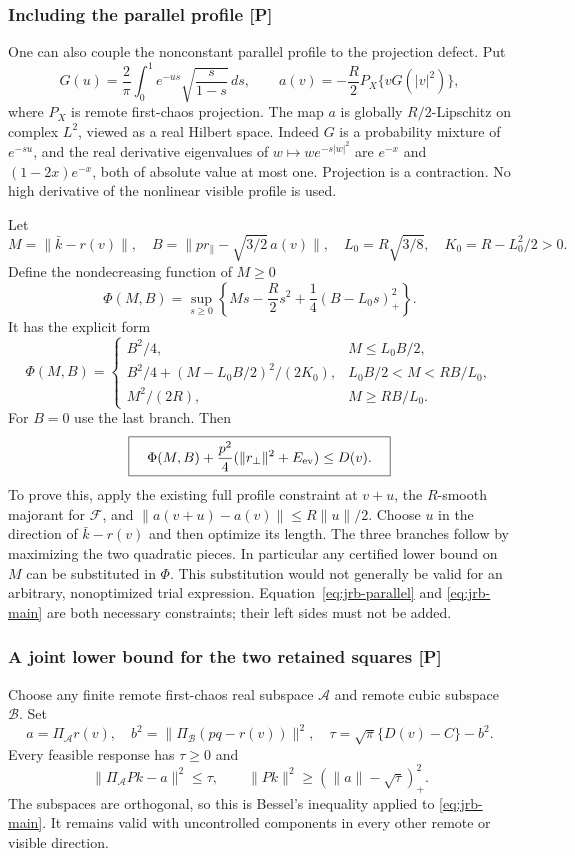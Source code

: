 \subsubsection{Including the parallel profile [P]}
One can also couple the nonconstant parallel profile to the projection
defect. Put
\[
 G(u)=\frac2\pi\int_0^1e^{-us}\sqrt{\frac{s}{1-s}}\,ds,\qquad
 a(v)=-\frac R2P_X\{vG(|v|^2)\},
\]
where $P_X$ is remote first-chaos projection. The map $a$ is globally
$R/2$-Lipschitz on complex $L^2$, viewed as a real Hilbert space.
Indeed $G$ is a probability mixture of $e^{-su}$, and the real derivative
eigenvalues of $w\mapsto we^{-s|w|^2}$ are $e^{-x}$ and
$(1-2x)e^{-x}$, both of absolute value at most one. Projection is a
contraction. No high derivative of the nonlinear visible profile is used.

Let
\[
 M=\|\bar k-r(v)\|,\quad
 B=\|p r_\parallel-\sqrt{3/2}\,a(v)\|,\quad
 L_0=R\sqrt{3/8},\quad K_0=R-L_0^2/2>0.
\]
Define the nondecreasing function of $M\ge0$
\[
 \Phi(M,B)=\sup_{s\ge0}
 \left\{Ms-\frac R2s^2+\frac14(B-L_0s)_+^2\right\}.
\]
It has the explicit form
\[
 \Phi(M,B)=\begin{cases}
 B^2/4,&M\le L_0B/2,\\
 B^2/4+(M-L_0B/2)^2/(2K_0),&L_0B/2<M<RB/L_0,\\
 M^2/(2R),&M\ge RB/L_0.
 \end{cases}
\]
For $B=0$ use the last branch. Then
\begin{equation}\label{eq:jrb-parallel}
 \boxed{\quad
 \Phi(M,B)+\frac{p^2}{4}(\|r_\perp\|^2+E_{\rm ev})\le D(v).
 \quad}
\end{equation}
To prove this, apply the existing full profile constraint at $v+u$,
the $R$-smooth majorant for $\mathcal F$, and
$\|a(v+u)-a(v)\|\le R\|u\|/2$. Choose $u$ in the direction of
$\bar k-r(v)$ and then optimize its length. The three branches follow
by maximizing the two quadratic pieces. In particular any certified
lower bound on $M$ can be substituted in $\Phi$. This substitution would
not generally be valid for an arbitrary, nonoptimized trial expression.
Equation~\eqref{eq:jrb-parallel} and \eqref{eq:jrb-main} are both necessary
constraints; their left sides must not be added.

\subsubsection{A joint lower bound for the two retained squares [P]}
Choose any finite remote first-chaos real subspace $\mathcal A$ and
remote cubic subspace $\mathcal B$. Set
\[
 a=\Pi_{\mathcal A}r(v),\quad
 b^2=\|\Pi_{\mathcal B}(pq-r(v))\|^2,\quad
 \tau=\sqrt\pi\{D(v)-C\}-b^2.
\]
Every feasible response has $\tau\ge0$ and
\begin{equation}\label{eq:jrb-ball}
 \|\Pi_{\mathcal A}Pk-a\|^2\le\tau,\qquad
 \|Pk\|^2\ge(\|a\|-\sqrt\tau)_+^2.
\end{equation}
The subspaces are orthogonal, so this is Bessel's inequality applied to
\eqref{eq:jrb-main}. It remains valid with uncontrolled components in
every other remote or visible direction.

